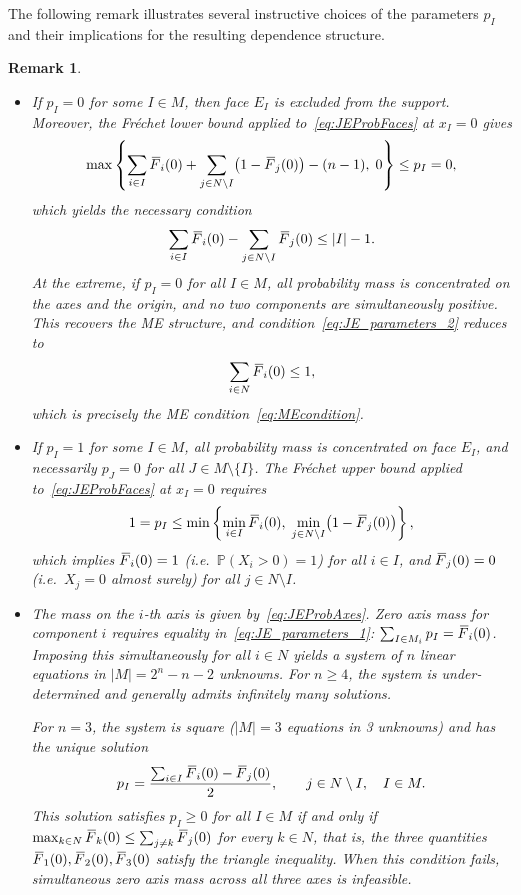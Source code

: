 \documentclass[letterpaper,12pt]{article}
\def \P {\mathbb{P}}
\numberwithin{equation}{section}
\newtheorem{remark}[theorem]{Remark}
\newcommand{\N}{{N}}
\newcommand{\M}{{M}}
\newcommand{\J}{{J}}
\newcommand{\I}{{I}}
\newcommand{\F}{\,\overline{\kern-0.175em F\kern-0em}}
\begin{document}
{The following remark illustrates several instructive choices of the parameters
$p_{\I}$ and their implications for the resulting dependence structure.

\begin{remark}
\label{rm:JE_Canonical_Remark}
\mbox{}
\begin{itemize}

\item[(1)]
If $p_{\I}=0$ for some $\I\in\M$, then face $E_{\I}$ is excluded from the support.
Moreover, the Fr\'{e}chet lower bound applied to~\eqref{eq:JEProbFaces} at
$x_\I=0$ gives
\[
\max\left\{
\sum_{i\in\I}\F_i(0)+\sum_{j\in\N\setminus \I}\bigl(1-\F_j(0)\bigr)-(n-1),\;0
\right\}\le p_{\I}=0,
\]
which yields the necessary condition
\[
\sum_{i\in\I}\F_i(0)-\sum_{j\in\N\setminus \I}\F_j(0)\le |\I|-1.
\]
At the extreme, if $p_{\I}=0$ for all $\I\in\M$, all probability mass is
concentrated on the axes and the origin, and no two components are simultaneously
positive. This recovers the ME structure, and condition~\eqref{eq:JE_parameters_2}
reduces to
\[
\sum_{i\in\N}\F_i(0)\le 1,
\]
which is precisely the ME condition~\eqref{eq:MEcondition}.

\item[(2)]
If $p_{\I}=1$ for some $\I\in\M$, all probability mass is concentrated on face
$E_{\I}$, and necessarily $p_{\J}=0$ for all $\J\in\M\setminus\{\I\}$. The
Fr\'{e}chet upper bound applied to~\eqref{eq:JEProbFaces} at $x_\I=0$ requires
\[
1=p_{\I}\le
\min\left\{\min_{i\in\I}\F_i(0),\;\min_{j\in\N\setminus\I}\bigl(1-\F_j(0)\bigr)\right\},
\]
which implies $\F_i(0)=1$ (i.e.\ $\P(X_i>0)=1$) for all $i\in\I$, and
$\F_j(0)=0$ (i.e.\ $X_j=0$ almost surely) for all $j\in\N\setminus\I$.

\item[(3)]
The mass on the $i$-th axis is given by~\eqref{eq:JEProbAxes}. Zero axis mass
for component $i$ requires equality in~\eqref{eq:JE_parameters_1}:
$\sum_{\I\in \M_i}p_{\I}=\F_i(0)$. Imposing this simultaneously for all
$i\in\N$ yields a system of $n$ linear equations in $|\M|=2^n-n-2$ unknowns.
For $n\ge 4$, the system is under-determined and generally admits infinitely many
solutions.

For $n=3$, the system is square ($|\M|=3$ equations in 3 unknowns) and has the
unique solution
\[
p_{\I}=\frac{\sum_{i\in\I}\F_i(0)-\F_j(0)}{2},
\qquad j\in\N\setminus\I,\quad\I\in\M.
\]
This solution satisfies $p_\I\ge0$ for all $\I\in\M$ if and only if
$\max_{k\in\N}\F_k(0)\le\sum_{j\ne k}\F_j(0)$ for every $k\in\N$, that is,
the three quantities $\F_1(0),\F_2(0),\F_3(0)$ satisfy the triangle inequality.
When this condition fails, simultaneous zero axis mass across all three axes is
infeasible.


\end{itemize}
\end{remark}}
\end{document}
